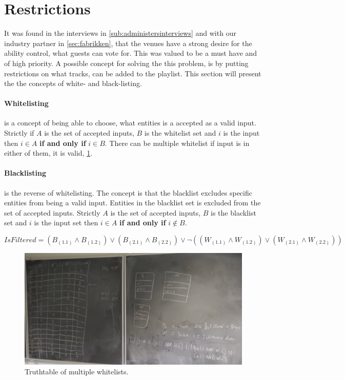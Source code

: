 \section{Restrictions}
\label{sec:restrictions}

It was found in the interviews in \cref{sub:administersinterviews} and with our industry partner in \cref{sec:fabrikken}, that the venues have a strong desire for the ability control, what guests can vote for. This was valued to be a must have and of high priority. A possible concept for solving the this problem, is by putting restrictions on what tracks, can be added to the playlist. This section will present the the concepts of white- and black-listing.

\paragraph{Whitelisting} is a concept of being able to choose, what entities is a accepted as a valid input. Strictly if $A$ is the set of accepted inputs, $B$ is the whitelist set and $i$ is the input then $i \in A$ \textbf{if and only if} $i \in B$. There can be multiple whitelist if input is in either of them, it is valid, \cref{fig:restrictions}.

\paragraph{Blacklisting} is the reverse of whitelisting. The concept is that the blacklist excludes specific entities from being a valid input. Entities in the blacklist set is excluded from the set of accepted inputs. Strictly $A$ is the set of accepted inputs, $B$ is the blacklist set and $i$ is the input set then $i \in A$ \textbf{if and only if} $i \notin B$.

	\[IsFiltered = (B_(1.1) \wedge B_(1.2)) \vee (B_(2.1) \wedge B_(2.2)) \vee \neg((W_(1.1) \wedge W_(1.2)) \vee (W_(2.1) \wedge W_(2.2)))\]

\begin{figure}[H]
  \centering
  \includegraphics[width=1.2\linewidth]{Images/restriction.jpg}
  \caption{Truthtable of multiple whitelists.}\label{fig:restrictions}
\end{figure}


